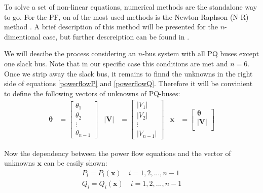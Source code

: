 \documentclass[a4paper,11pt, titlepage, twoside]{article}
\begin{document}
To solve a set of non-linear equations, numerical methods are the standalone way to go. For the PF, on of the most used methods is the Newton-Raphson (N-R) method \cite{NRusual}. A brief description of this method will be presented for the $n$-dimentional case, but further descreiption can be found in \cite{llibrebase}.

We will descibe the process considering an $n$-bus system with all PQ buses except one slack bus. Note that in our specific case this conditions are met and $n = 6$. Once we strip away the slack bus, it remains to finnd the unknowns in the right side of equations \ref{powerflowP} and \ref{powerflowQ}. Therefore it will be convinient to
define the following vectors of unknowns of PQ-buses:
\begin{equation}
\begin{aligned}
    \mathbf{\theta} &= \begin{bmatrix}
    \theta_1 \\
    \theta_2 \\
    \vdots \\
    \theta_{n-1}
    \end{bmatrix} &
    \mathbf{|V|} &= \begin{bmatrix}
    |V_1| \\
    |V_2| \\
    \vdots \\
    |V_{n-1}|
    \end{bmatrix} &
    \mathbf{x} &= \begin{bmatrix}
    \mathbf{\theta} \\
    \mathbf{|V|} \\
    \end{bmatrix}
\end{aligned}
\end{equation}

Now the dependency between the power flow equations and the vector of unknowns $\mathbf{x}$ can be easily shown:
\begin{subequations}
\begin{align}
    P_i = P_i(\mathbf{x}) \quad i = 1,2,...,n-1 \\
    Q_i = Q_i(\mathbf{x}) \quad i = 1,2,...,n-1
\end{align}       
\end{subequations}
\end{document}
